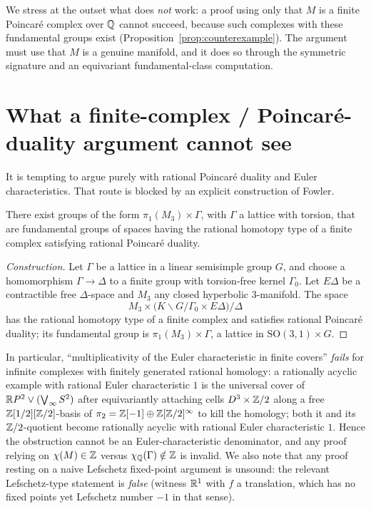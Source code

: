 \documentclass[11pt]{article}
\begin{document}
We stress at the outset what does \emph{not} work: a proof using only that $M$
is a finite Poincar\'e complex over $\mathbb{Q}$ cannot succeed, because such complexes
with these fundamental groups exist (Proposition~\ref{prop:counterexample}). The
argument must use that $M$ is a genuine manifold, and it does so through the
symmetric signature and an equivariant fundamental-class computation.

\section*{What a finite-complex / Poincar\'e-duality argument cannot see}

It is tempting to argue purely with rational Poincar\'e duality and Euler
characteristics. That route is blocked by an explicit construction of Fowler.

\begin{qsevenproposition}\label{prop:counterexample}
There exist groups of the form $\pi_1(M_3)\times\Gamma$, with $\Gamma$ a lattice
with torsion, that are fundamental groups of spaces having the rational homotopy
type of a finite complex satisfying rational Poincar\'e duality.
\end{qsevenproposition}

\begin{proof}[Construction]
Let $\Gamma$ be a lattice in a linear semisimple group $G$, and choose a
homomorphism $\Gamma\to\Delta$ to a finite group with torsion-free kernel
$\Gamma_0$. Let $E\Delta$ be a contractible free $\Delta$-space and $M_3$ any
closed hyperbolic $3$-manifold. The space
\[
  M_3\times\bigl(K\backslash G/\Gamma_0\times E\Delta\bigr)/\Delta
\]
has the rational homotopy type of a finite complex and satisfies rational
Poincar\'e duality; its fundamental group is $\pi_1(M_3)\times\Gamma$, a lattice
in $\mathrm{SO}(3,1)\times G$.
\end{proof}

In particular, ``multiplicativity of the Euler characteristic in finite covers''
\emph{fails} for infinite complexes with finitely generated rational homology: a
rationally acyclic example with rational Euler characteristic $1$ is the
universal cover of $\mathbb{R} P^2\vee(\bigvee_\infty S^2)$ after equivariantly attaching
cells $D^3\times\mathbb{Z}/2$ along a free $\mathbb{Z}[1/2][\mathbb{Z}/2]$-basis of
$\pi_2=\mathbb{Z}[-1]\oplus\mathbb{Z}[\mathbb{Z}/2]^{\infty}$ to kill the homology; both it and its
$\mathbb{Z}/2$-quotient become rationally acyclic with rational Euler characteristic $1$.
Hence the obstruction cannot be an Euler-characteristic denominator, and any
proof relying on $\chi(M)\in\mathbb{Z}$ versus $\chi_{\mathbb{Q}}(\Gamma)\notin\mathbb{Z}$ is invalid. We
also note that any proof resting on a naive Lefschetz fixed-point argument is
unsound: the relevant Lefschetz-type statement is \emph{false} (witness
$\mathbb{R}^1$ with $f$ a translation, which has no fixed points yet Lefschetz number
$-1$ in that sense).
\end{document}
